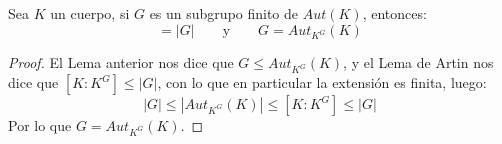 \begin{teo}
    Sea $K$ un cuerpo, si $G$ es un subgrupo finito de $Aut(K)$, entonces:
    \begin{equation*}
        [K:K^G] = |G| \qquad \text{y}\qquad G = Aut_{K^G}(K)
    \end{equation*}
    \begin{proof}
        El Lema anterior nos dice que $G\leq Aut_{K^G}(K)$, y el Lema de Artin nos dice que $[K:K^G]\leq |G|$, con lo que en particular la extensión es finita, luego:
        \begin{equation*}
            |G| \leq |Aut_{K^G}(K)| \leq [K:K^G] \leq |G|
        \end{equation*}
        Por lo que $G = Aut_{K^G}(K)$.
    \end{proof}
\end{teo}


